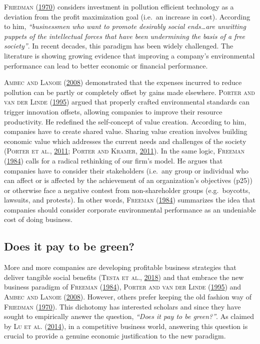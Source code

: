 \documentclass[12pt,]{article}
\begin{document}
\textsc{Friedman} (\protect\hyperlink{ref-MiltonFriedman1970}{1970})
considers investment in pollution efficient technology as a deviation
from the profit maximization goal (i.e.~an increase in cost). According
to him, \emph{``businessmen who want to promote desirably social
ends\ldots{}are unwitting puppets of the intellectual forces that have
been undermining the basis of a free society''}. In recent decades, this
paradigm has been widely challenged. The literature is showing growing
evidence that improving a company's environmental performance can lead
to better economic or financial performance.

\textsc{Ambec and Lanoie} (\protect\hyperlink{ref-Ambec2008}{2008})
demonstrated that the expenses incurred to reduce pollution can be
partly or completely offset by gains made elsewhere. \textsc{Porter and
van der Linde} (\protect\hyperlink{ref-Porter1995}{1995}) argued that
properly crafted environmental standards can trigger innovation offsets,
allowing companies to improve their resource productivity. He redefined
the self-concept of value creation. According to him, companies have to
create shared value. Sharing value creation involves building economic
value which addresses the current needs and challenges of the society
(\textsc{Porter et al.}, \protect\hyperlink{ref-Porter2011a}{2011};
\textsc{Porter and Kramer}, \protect\hyperlink{ref-Porter2011}{2011}).
In the same logic, \textsc{Freeman}
(\protect\hyperlink{ref-Freeman1984}{1984}) calls for a radical
rethinking of our firm's model. He argues that companies have to
consider their stakeholders (i.e.~any group or individual who can affect
or is affected by the achievement of an organization's objectives (p25))
or otherwise face a negative contest from non-shareholder groups
(e.g.~boycotts, lawsuits, and protests). In other words,
\textsc{Freeman} (\protect\hyperlink{ref-Freeman1984}{1984}) summarizes
the idea that companies should consider corporate environmental
performance as an undeniable cost of doing business.

\subsection{Does it pay to be green?}\label{does-it-pay-to-be-green}

More and more companies are developing profitable business strategies
that deliver tangible social benefits (\textsc{Testa et al.},
\protect\hyperlink{ref-Testa2018}{2018}) and that embrace the new
business paradigm of \textsc{Freeman}
(\protect\hyperlink{ref-Freeman1984}{1984}), \textsc{Porter and van der
Linde} (\protect\hyperlink{ref-Porter1995}{1995}) and \textsc{Ambec and
Lanoie} (\protect\hyperlink{ref-Ambec2008}{2008}). However, others
prefer keeping the old fashion way of \textsc{Friedman}
(\protect\hyperlink{ref-MiltonFriedman1970}{1970}). This dichotomy has
interested scholars and since they have sought to empirically answer the
question, \emph{``Does it pay to be green?''}. As claimed by \textsc{Lu
et al.} (\protect\hyperlink{ref-Ludecadedebatenexus2014}{2014}), in a
competitive business world, answering this question is crucial to
provide a genuine economic justification to the new paradigm.
\end{document}
